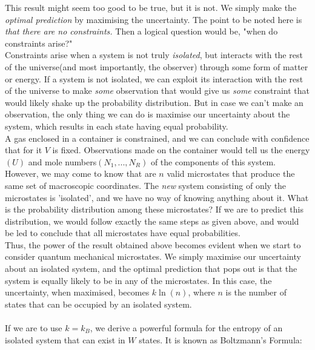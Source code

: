 \documentclass[oneside]{book}
\begin{document}
This result might seem too good to be true, but it is not. We simply make the \emph{optimal prediction} by maximising the uncertainty. The point to be noted here is \emph{that there are no constraints.} Then a logical question would be, "when do constraints arise?" \\

Constraints arise when a system is not truly \emph{isolated}, but interacts with the rest of the universe(and most importantly, the observer) through some form of matter or energy. If a system is not isolated, we can exploit its interaction with the rest of the universe to make \emph{some} observation that would give us \emph{some} constraint that would likely shake up the probability distribution. But in case we can't make an observation, the only thing we can do is maximise our uncertainty about the system, which results in each state having equal probability.\\

A gas enclosed in a container is constrained, and we can conclude with confidence that for it $V$ is fixed. Observations made on the container would tell us the energy $(U)$ and mole numbers$(N_1,...,N_R)$ of the components of this system. However, we may come to know that are $n$ valid microstates that produce the same set of macroscopic coordinates. The \emph{new} system consisting of only the microstates is 'isolated', and we have no way of knowing anything about it. What is the probability distribution among these microstates? If we are to predict this distribution, we would follow exactly the same steps as given above, and would be led to conclude that all microstates have equal probabilities.\\

Thus, the power of the result obtained above becomes evident when we start to consider quantum mechanical microstates. We simply maximise our uncertainty about an isolated system, and the optimal prediction that pops out is that the system is equally likely to be in any of the microstates. In this case, the uncertainty, when maximised, becomes $k\ln(n)$, where $n$ is the number of states that can be occupied by an isolated system.\\ \\ 
If we are to use $k = k_B$, we derive a powerful formula for the entropy of an isolated system that can exist in $W$ states. It is known as Boltzmann's Formula:

\begin{center}
\end{center}
\end{document}
